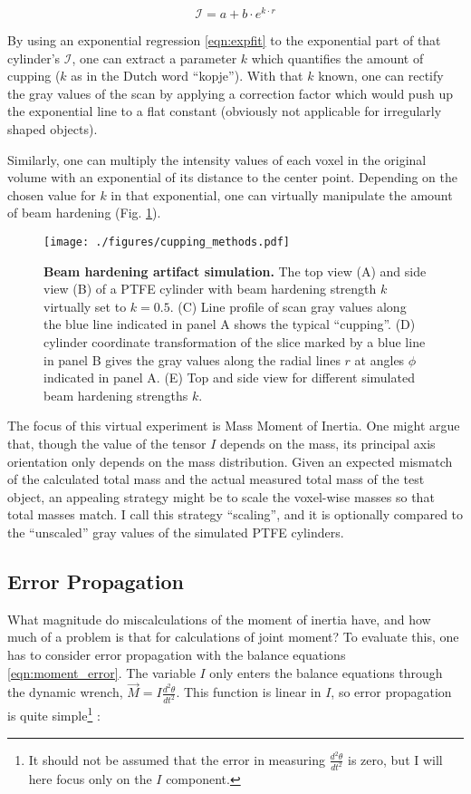 \begin{equation}\label{eqn:expfit}
 \mathcal{I} = a+b\cdot e^{k\cdot r}
\end{equation}

By using an exponential regression \eqref{eqn:expfit} to the exponential part of that cylinder's  \(\mathcal{I}\), one can extract a parameter \(k\) which quantifies the amount of cupping (\(k\) as in the Dutch word ``kopje'').
With that \(k\) known, one can rectify the gray values of the scan by applying a correction factor which would push up the exponential line to a flat constant (obviously not applicable for irregularly shaped objects).

Similarly, one can multiply the intensity values of each voxel in the original volume with an exponential of its distance to the center point.
Depending on the chosen value for \(k\) in that exponential, one can virtually manipulate the amount of beam hardening (Fig. \ref{fig:cupping_methods}).


\begin{figure}[p]
\centering
\texttt{[image: ./figures/cupping\_methods.pdf]}
\caption{\label{fig:cupping_methods}\textbf{Beam hardening artifact simulation.} The top view (A) and side view (B) of a PTFE cylinder with beam hardening strength \(k\) virtually set to \(k=0.5\). (C) Line profile of scan gray values along the blue line indicated in panel A shows the typical ``cupping''. (D) cylinder coordinate transformation of the slice marked by a blue line in panel B gives the gray values along the radial lines \(r\) at angles \(\phi\) indicated in panel A. (E) Top and side view for different simulated beam hardening strengths \(k\).}
\end{figure}


The focus of this virtual experiment is Mass Moment of Inertia.
One might argue that, though the value of the tensor \(I\) depends on the mass, its principal axis orientation only depends on the mass distribution.
Given an expected mismatch of the calculated total mass and the actual measured total mass of the test object, an appealing strategy might be to scale the voxel-wise masses so that total masses match.
I call this strategy ``scaling'', and it is optionally compared to the ``unscaled'' gray values of the simulated PTFE cylinders.
\subsection{Error Propagation}
\label{sec:org1ed2fbe}
What magnitude do miscalculations of the moment of inertia have, and how much of a problem is that for calculations of joint moment?
To evaluate this, one has to consider error propagation \citep{Hughes2010,Arroyave2022,Myers2015} with the balance equations \eqref{eqn:moment_error}.
The variable \(I\) only enters the balance equations through the dynamic wrench, \(\vec{M} = I \frac{d^2\theta}{dt^2}\).
This function is linear in \(I\), so error propagation is quite simple\footnote{It should not be assumed that the error in measuring \(\frac{d^2\theta}{dt^2}\) is zero, but I will here focus only on the \(I\) component.} \citep{Normann2016}:

